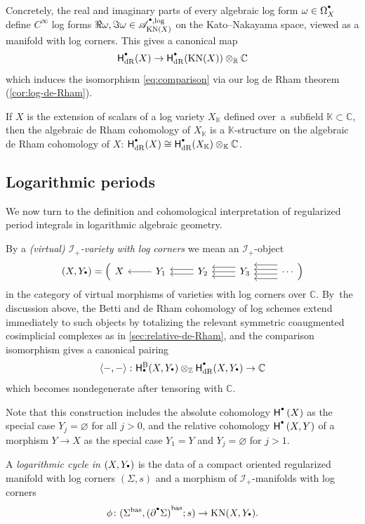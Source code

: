 \documentclass[JEP,XML,SOM,Unicode,NoFloatCountersInSection,published]{cedram}
\let\oldbullet\bullet
\renewcommand{\bullet}{{\raisebox{1pt}{$\scriptscriptstyle\oldbullet$}}}
\theoremstyle{definition}
\theoremstyle{remark}
\newenvironment{remark}
  {\pushQED{\qed}\renewcommand{\qedsymbol}{$\lozenge$}\remarkx}
  {\popQED\endremarkx}
\let\defn\emph
\newcommand{\CC}{\mathbb{C}}
\newcommand{\KK}{\mathbb{K}}
\newcommand{\RR}{\mathbb{R}}
\newcommand{\ZZ}{\mathbb{Z}}
\newcommand{\rbrac}[1]{\left(#1\right)}
\newcommand{\abrac}[1]{\left\langle#1\right\rangle}
\newcommand{\cAlog}[2][\bullet]{\mathscr{A}^{#1,\log}_{#2}}
\newcommand{\Sig}{\Sigma}
\newcommand{\bas}[1]{{#1}^{\mathrm{bas}}}
\newcommand{\Sigbas}{\bas{\Sig}}
\newcommand{\bdSig}[1][]{\partial^{#1}\Sigma}
\newcommand{\KN}[1]{\mathrm{KN}(#1)}
\newcommand{\coH}[2][\bullet]{\mathsf{H}^{#1}\rbrac{#2}}
\newcommand{\HdR}[2][\bullet]{\mathsf{H}_{\mathrm{dR}}^{#1}(#2)}
\newcommand{\HlgyB}[2][\bullet]{\mathsf{H}^{\mathrm{B}}_{#1}(#2)}
\newcommand{\forms}[2][\bullet]{\Omega^{#1}_{#2}}
\newcommand{\augsimp}[4]
{
\begin{tikzcd}[ampersand replacement=\&]
     #1 \& #2 \ar[l] \& #3
     \ar[l,shift left = 1]\ar[l,shift right=1] \& #4 \ar[l,shift left = 2]\ar[l,shift left = 0]\ar[l,shift left = -2] \& \ar[l,shift left = 3]\ar[l,shift left = 1]\ar[l,shift left = -1]\ar[l,shift left = -3] \cdots
    \end{tikzcd}
}
\newcommand{\ascat}{\mathscr{I}_+}
\begin{document}
Concretely, the real and imaginary parts of every algebraic log form $\omega \in \forms{X}$ define $C^\infty$ log forms $\Re \omega, \Im \omega \in \cAlog{\KN{X}}$ on the Kato--Nakayama space, viewed as a manifold with log corners. This gives a canonical map
\[
\HdR{X} \to \HdR{\KN{X}}\otimes_\RR \CC
\]
which induces the isomorphism \eqref{eq:comparison} via our log de Rham theorem (\autoref{cor:log-de-Rham}).

\begin{remark}\label{rmk:dR-over-K}
If $X$ is the extension of scalars of a log variety $X_\KK$ defined over~a~sub\-field $\KK\subset \CC$, then the algebraic de Rham cohomology of $X_\KK$ is a $\KK$-structure on the algebraic de Rham cohomology of $X$: $\HdR{X}\cong \HdR{X_\KK}\otimes_\KK\CC$.
\end{remark}

\subsection{Logarithmic periods}

We now turn to the definition and cohomological interpretation of regularized period integrals in logarithmic algebraic geometry.

By a \defn{(virtual) $\ascat$-variety with log corners} we mean an $\ascat$-object
\[
(X,Y_\bullet) = \rbrac{\augsimp{X}{Y_1}{Y_2}{Y_3}}
\]
in the category of virtual morphisms of varieties with log corners over $\CC$. By~the discussion above, the Betti and de Rham cohomology of log schemes extend immediately to such objects by totalizing the relevant symmetric coaugmented cosimplicial complexes as in \autoref{sec:relative-de-Rham}, and the comparison isomorphism gives a canonical pairing
\begin{equation}\label{eq:BdR-pairing-diagrams-varieties-log-corners}
\abrac{-,-} \colon \HlgyB{X,Y_\bullet} \otimes_\ZZ \HdR{X,Y_\bullet} \to \CC
\end{equation}
which becomes nondegenerate after tensoring with $\CC$.

Note that this construction includes the absolute cohomology $\coH{X}$ as the special case $Y_j = \varnothing$ for all $j > 0$, and the relative cohomology $\coH{X,Y}$ of a morphism $Y\to X$ as the special case $Y_1=Y$ and $Y_j = \varnothing$ for $j > 1$.

\begin{definition}\label{def:log-cycle}
A \defn{logarithmic cycle in $(X,Y_\bullet)$} is the data of a compact oriented regularized manifold with log corners $(\Sig,s)$ and a morphism of $\ascat$-manifolds with log corners
\[
\phi \colon (\Sigbas,\bas{(\bdSig[\bullet])};s) \to \KN{X,Y_\bullet}.
\]
\end{definition}
\end{document}
